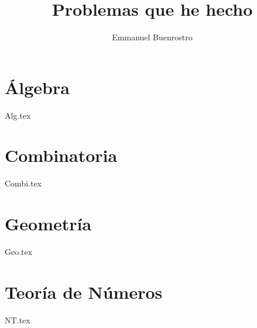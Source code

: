 \documentclass[11pt]{scrbook}
\title {Problemas que he hecho}
\author{Emmanuel Buenrostro}
\begin{document}
\maketitle
\tableofcontents

\part{\'Algebra}
{Alg.tex}

\part{Combinatoria}
{Combi.tex}

\part{Geometr\'ia}
{Geo.tex}

\part{Teor\'ia de N\'umeros}
{NT.tex}

\nocite{*}

\printbibliography[
heading=bibintoc,
title={Bibliograf\'ia}
]
\end{document}
